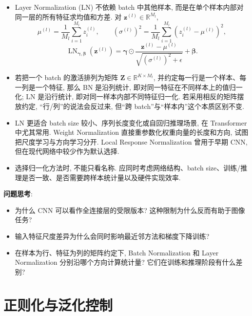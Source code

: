 \documentclass{../nndlcourse}
\begin{document}
\begin{enumerate}
    \begin{itemize}
      \item Layer Normalization (LN) 不依赖 batch 中其他样本, 而是在单个样本内部对同一层的所有特征求均值和方差. 对 $\boldsymbol{z}^{(l)}\in\mathbb{R}^{M_l}$,
      \[
        \mu^{(l)}
        =
        \frac{1}{M_l}\sum_{i=1}^{M_l}z_i^{(l)},
        \qquad
        {\left(\sigma^{(l)}\right)}^2
        =
        \frac{1}{M_l}\sum_{i=1}^{M_l}
        {\left(z_i^{(l)}-\mu^{(l)}\right)}^2,
      \]
      \[
        \operatorname{LN}_{\boldsymbol{\gamma},\boldsymbol{\beta}}
        \left(\boldsymbol{z}^{(l)}\right)
        =
        \boldsymbol{\gamma}
        \odot
        \frac{\boldsymbol{z}^{(l)}-\mu^{(l)}}
        {\sqrt{{\left(\sigma^{(l)}\right)}^2+\epsilon}}
        +
        \boldsymbol{\beta}.
      \]
      \item 若把一个 batch 的激活排列为矩阵 $\boldsymbol{Z}\in\mathbb{R}^{K\times M_l}$, 并约定每一行是一个样本、每一列是一个特征, 那么 BN 是沿列统计, 即对同一特征在不同样本上的值归一化; LN 是沿行统计, 即对同一样本内部不同特征归一化. 若采用相反的矩阵摆放约定, “行/列”的说法会反过来, 但“跨 batch”与“样本内”这个本质区别不变.
      \item LN 更适合 batch size 较小、序列长度变化或自回归推理场景, 在 Transformer 中尤其常用. Weight Normalization 直接重参数化权重向量的长度和方向, 试图把尺度学习与方向学习分开. Local Response Normalization 曾用于早期 CNN, 但在现代网络中较少作为默认选择.
      \item 选择归一化方法时, 不能只看名称. 应同时考虑网络结构、batch size、训练/推理是否一致、是否需要跨样本统计量以及硬件实现效率.
    \end{itemize}
\end{enumerate}

\textbf{问题思考}:
\begin{itemize}
  \item 为什么 CNN 可以看作全连接层的受限版本? 这种限制为什么反而有助于图像任务?
  \item 输入特征尺度差异为什么会同时影响最近邻方法和梯度下降训练?
  \item 在样本为行、特征为列的矩阵约定下, Batch Normalization 和 Layer Normalization 分别沿哪个方向计算统计量? 它们在训练和推理阶段有什么差别?
\end{itemize}

\section{正则化与泛化控制}
\end{document}
